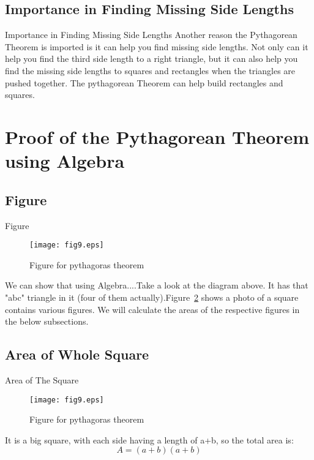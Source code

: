 \documentclass[10pt]{beamer}
\begin{document}
\subsection{Importance in Finding Missing Side Lengths}
\begin{frame}{Importance in Finding Missing Side Lengths}
Another reason the Pythagorean Theorem is imported is it can help you find missing side lengths. Not only can it help you find the third side length to a right triangle, but it can also help you find the missing side lengths to squares and rectangles when the triangles are pushed together. The pythagorean Theorem can help build rectangles and squares.
\end{frame}

\section{Proof of the Pythagorean Theorem using Algebra}
\label{sec:proof}
\subsection{Figure}
\begin{frame}{Figure}
\begin{figure}[htb!]
  \begin{center}
    \texttt{[image: fig9.eps]}
   \end{center}
  \caption{Figure for pythagoras theorem}
  \label{image1}
\end{figure}
We can show that using Algebra....Take a look at the diagram above. It has that "abc" triangle in it (four of them actually).Figure~\ref{image1} shows a photo of a square contains various figures. We will calculate the areas of the respective figures in the below subsections.
\end{frame}

\subsection{Area of Whole Square}
\label{a_square}
\begin{frame}{Area of The Square}
\begin{figure}[htb!]
  \begin{center}
    \texttt{[image: fig9.eps]}
   \end{center}
  \caption{Figure for pythagoras theorem}
  \label{image1}
\end{figure}

It is a big square, with each side having a length of a+b, so the total area is:
$$A = (a+b)(a+b)$$
\end{frame}
\end{document}

